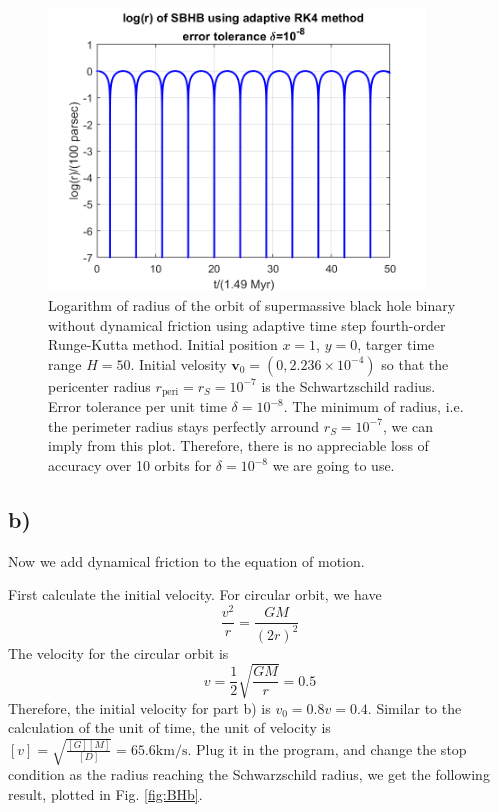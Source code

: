 \documentclass[12pt, graphicx]{article}
\begin{document}
\clearpage

\begin{figure}[ht]
\centering
\includegraphics[width = 100mm]{BH_a8logr.png}
\caption{Logarithm of radius of the orbit of supermassive black hole binary without dynamical friction using adaptive time step fourth-order Runge-Kutta method. Initial position $x=1$, $y=0$, targer time range $H=50$. Initial velosity $\mathbf{v}_0=(0,2.236\times10^{-4})$ so that the pericenter radius $r_\mathrm{peri}=r_S=10^{-7}$ is the Schwartzschild radius. Error tolerance per unit time $\delta=10^{-8}$. The minimum of radius, i.e. the perimeter radius stays perfectly arround $r_S=10^{-7}$, we can imply from this plot. Therefore, there is no appreciable loss of accuracy over 10 orbits for $\delta=10^{-8}$ we are going to use.}
\label{fig:BHalogr}
\end{figure}

\subsection*{b)}
Now we add dynamical friction to the equation of motion.\par
First calculate the initial velocity. For circular orbit, we have
\begin{equation}
\frac{v^2}{r}=\frac{GM}{(2r)^2}
\end{equation}
The velocity for the circular orbit is
\begin{equation}
v=\frac{1}{2}\sqrt{\frac{GM}{r}}=0.5
\end{equation}
Therefore, the initial velocity for part b) is $v_0=0.8v=0.4$. Similar to the calculation of the unit of time, the unit of velocity is $[v]=\sqrt{\frac{[G][M]}{[D]}}=65.6\mathrm{km/s}$. Plug it in the program, and change the stop condition as the radius reaching the Schwarzschild radius, we get the following result, plotted in Fig. \ref{fig:BHb}. 
\end{document}
